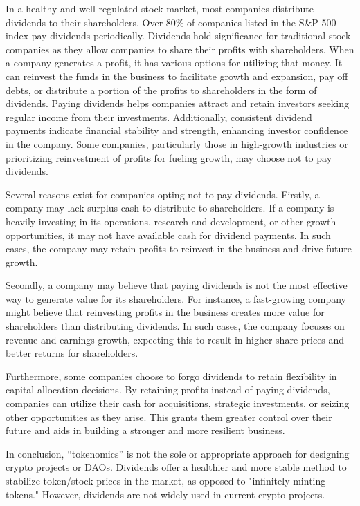 \documentclass[main.tex]{subfiles}
\begin{document}
In a healthy and well-regulated stock market, most companies distribute dividends to their shareholders. Over 80\% of companies listed in the S\&P 500 index pay dividends periodically. Dividends hold significance for traditional stock companies as they allow companies to share their profits with shareholders. When a company generates a profit, it has various options for utilizing that money. It can reinvest the funds in the business to facilitate growth and expansion, pay off debts, or distribute a portion of the profits to shareholders in the form of dividends. Paying dividends helps companies attract and retain investors seeking regular income from their investments. Additionally, consistent dividend payments indicate financial stability and strength, enhancing investor confidence in the company. Some companies, particularly those in high-growth industries or prioritizing reinvestment of profits for fueling growth, may choose not to pay dividends.

Several reasons exist for companies opting not to pay dividends. Firstly, a company may lack surplus cash to distribute to shareholders. If a company is heavily investing in its operations, research and development, or other growth opportunities, it may not have available cash for dividend payments. In such cases, the company may retain profits to reinvest in the business and drive future growth.

Secondly, a company may believe that paying dividends is not the most effective way to generate value for its shareholders. For instance, a fast-growing company might believe that reinvesting profits in the business creates more value for shareholders than distributing dividends. In such cases, the company focuses on revenue and earnings growth, expecting this to result in higher share prices and better returns for shareholders.

Furthermore, some companies choose to forgo dividends to retain flexibility in capital allocation decisions. By retaining profits instead of paying dividends, companies can utilize their cash for acquisitions, strategic investments, or seizing other opportunities as they arise. This grants them greater control over their future and aids in building a stronger and more resilient business.

In conclusion, ``tokenomics'' is not the sole or appropriate approach for designing crypto projects or DAOs. Dividends offer a healthier and more stable method to stabilize token/stock prices in the market, as opposed to "infinitely minting tokens." However, dividends are not widely used in current crypto projects.
\end{document}
